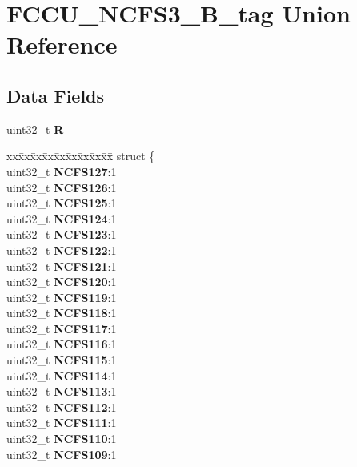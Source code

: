 \hypertarget{unionFCCU__NCFS3__32B__tag}{}\section{F\+C\+C\+U\+\_\+\+N\+C\+F\+S3\+\_\+B\+\_\+tag Union Reference}
\label{unionFCCU__NCFS3__32B__tag}
\subsection*{Data Fields}
\begin{DoxyCompactItemize}
\item 
\mbox{\label{unionFCCU__NCFS3__32B__tag_a46d2be753e3d50a1779e117b83757806}} 
uint32\+\_\+t {\bfseries R}
\item 
\mbox{\label{unionFCCU__NCFS3__32B__tag_a46c5b0625b21666458c184d2afc17524}} 
\begin{tabbing}
xx\=xx\=xx\=xx\=xx\=xx\=xx\=xx\=xx\=\kill
struct \{\\
\>uint32\_t {\bfseries NCFS127}:1\\
\>uint32\_t {\bfseries NCFS126}:1\\
\>uint32\_t {\bfseries NCFS125}:1\\
\>uint32\_t {\bfseries NCFS124}:1\\
\>uint32\_t {\bfseries NCFS123}:1\\
\>uint32\_t {\bfseries NCFS122}:1\\
\>uint32\_t {\bfseries NCFS121}:1\\
\>uint32\_t {\bfseries NCFS120}:1\\
\>uint32\_t {\bfseries NCFS119}:1\\
\>uint32\_t {\bfseries NCFS118}:1\\
\>uint32\_t {\bfseries NCFS117}:1\\
\>uint32\_t {\bfseries NCFS116}:1\\
\>uint32\_t {\bfseries NCFS115}:1\\
\>uint32\_t {\bfseries NCFS114}:1\\
\>uint32\_t {\bfseries NCFS113}:1\\
\>uint32\_t {\bfseries NCFS112}:1\\
\>uint32\_t {\bfseries NCFS111}:1\\
\>uint32\_t {\bfseries NCFS110}:1\\
\>uint32\_t {\bfseries NCFS109}:1\\

\end{tabbing}
\end{DoxyCompactItemize}
